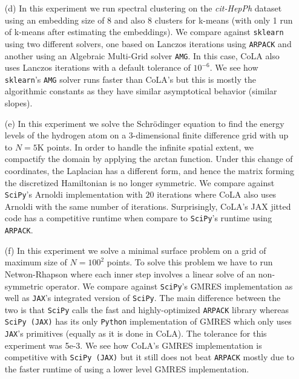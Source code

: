 \documentclass{article}
\begin{document}
\begin{enumerate}
    \item[(d)]
    In this experiment we run spectral clustering on the \emph{cit-HepPh} dataset
    using an embedding size of 8 and also 8 clusters for k-means (with only 1 run of k-means after estimating the embeddings).
    We compare against \texttt{sklearn} using two different solvers, one based on
    Lanczos iterations using \texttt{ARPACK} and another using an
    Algebraic Multi-Grid solver \texttt{AMG}.
    In this case, CoLA also uses Lanczos iterations with a default tolerance of $10^{-6}$.
    We see how \texttt{sklearn}'s \texttt{AMG} solver runs faster than CoLA's
    but this is mostly the algorithmic constants as they have similar asymptotical behavior (similar slopes).

    \item[(e)]
    In this experiment we solve the Schr\"{o}dinger equation to find the energy levels of the hydrogen atom on a $3$-dimensional finite difference grid
    with up to $N=5$K points. In order to handle the infinite spatial extent, we compactify the domain by applying the arctan function. Under this change of coordinates, the Laplacian has a different form, and hence the matrix forming the discretized Hamiltonian is no longer symmetric.
    We compare against \texttt{SciPy}'s Arnoldi implementation with $20$ iterations where
    CoLA also uses Arnoldi with the same number of iterations.
    Surprisingly, CoLA's JAX jitted code has a competitive runtime when compare to
    \texttt{SciPy}'s runtime using \texttt{ARPACK}.

    \item[(f)]
    In this experiment we solve a minimal surface problem on a grid of maximum size of
    $N=100^2$ points.
    To solve this problem we have to run Netwon-Rhapson where each inner step involves
    a linear solve of an non-symmetric operator.
    We compare against \texttt{SciPy}'s GMRES implementation as well as
    \texttt{JAX}'s integrated version of \texttt{SciPy}.
    The main difference between the two is that \texttt{SciPy} calls the
    fast and highly-optimized \texttt{ARPACK} library whereas
    \texttt{SciPy\,(JAX)} has its only \texttt{Python} implementation of GMRES
    which only uses \texttt{JAX}'s primitives (equally as it is done in CoLA).
    The tolerance for this experiment was 5e-3.
    We see how CoLA's GMRES implementation is competitive with \texttt{SciPy\,(JAX)}
    but it still does not beat \texttt{ARPACK} mostly due to the faster runtime of using a
    lower level GMRES implementation.
\end{enumerate}
\end{document}
